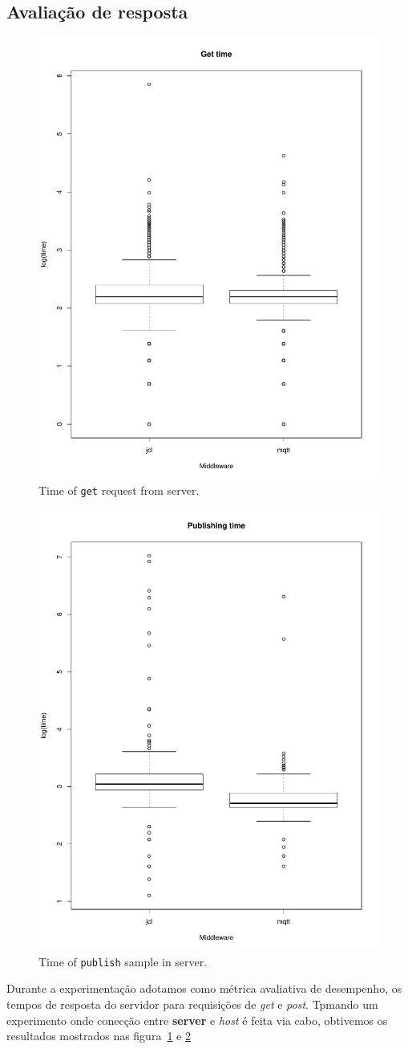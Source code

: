 \documentclass[12pt]{article}
\begin{document}
\subsection{Avaliação de resposta}
\begin{figure}
\includegraphics[width=.6\textwidth]{imgs/get-time}
\caption{Time of \texttt{get} request from server.}
\label{fig:get}
\end{figure}
\begin{figure}
\includegraphics[width=.75\textwidth]{imgs/pub-time}
\caption{Time of \texttt{publish} sample in server.}
\label{fig:post}
\end{figure}
Durante a experimentação adotamos como métrica avaliativa de desempenho, os tempos de resposta do servidor para requisições de \textit{get} e \textit{post}. Tpmando um experimento onde conecção entre \textbf{server} e \textit{host} é feita via cabo, obtivemos os resultados mostrados nas figura~\ref{fig:get} e \ref{fig:post}
\end{document}
